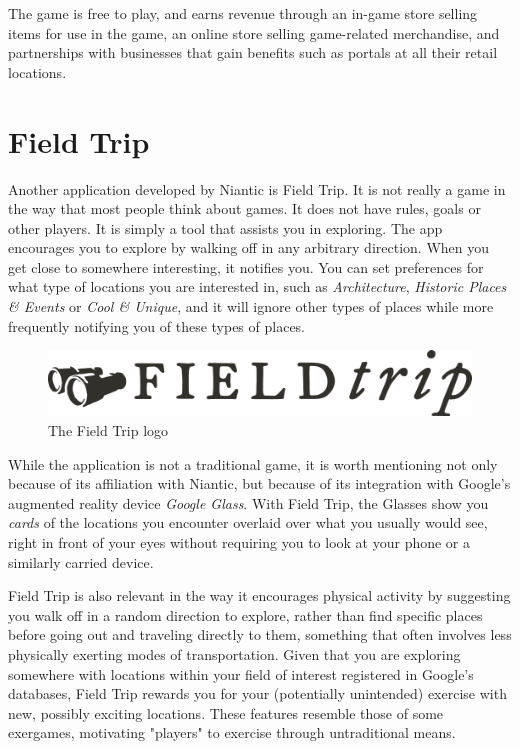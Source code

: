 The game is free to play, and earns revenue through an in-game store selling items for use in the game, an online store selling game-related merchandise, and partnerships with businesses that gain benefits such as portals at all their retail locations.

\section{Field Trip}

Another application developed by Niantic is Field Trip. It is not really a game in the way that most people think about games. It does not have rules, goals or other players. It is simply a tool that assists you in exploring. The app encourages you to explore by walking off in any arbitrary direction. When you get close to somewhere interesting, it notifies you. You can set preferences for what type of locations you are interested in, such as \emph{Architecture}, \emph{Historic Places \& Events} or \emph{Cool \& Unique}, and it will ignore other types of places while more frequently notifying you of these types of places.

\begin{figure}[h]
	\centering
	\includegraphics[width=\textwidth]{Figures/fieldtrip-logo}
	\caption{The Field Trip logo}
\end{figure}

While the application is not a traditional game, it is worth mentioning not only because of its affiliation with Niantic, but because of its integration with Google's augmented reality device \emph{Google Glass}. With Field Trip, the Glasses show you \emph{cards} of the locations you encounter overlaid over what you usually would see, right in front of your eyes without requiring you to look at your phone or a similarly carried device.

Field Trip is also relevant in the way it encourages physical activity by suggesting you walk off in a random direction to explore, rather than find specific places before going out and traveling directly to them, something that often involves less physically exerting modes of transportation. Given that you are exploring somewhere with locations within your field of interest registered in Google's databases, Field Trip rewards you for your (potentially unintended) exercise with new, possibly exciting locations. These features resemble those of some exergames, motivating "players" to exercise through untraditional means.

